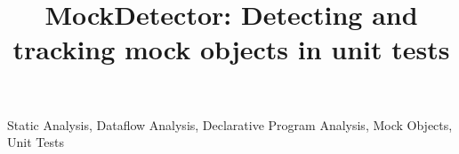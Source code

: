 \documentclass[conference]{IEEEtran}
\begin{document}

\title{MockDetector: Detecting and tracking mock objects in unit tests}


\maketitle



\begin{IEEEkeywords}
Static Analysis, Dataflow Analysis, Declarative Program Analysis, Mock Objects, Unit Tests
\end{IEEEkeywords}









\end{document}

